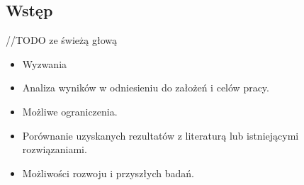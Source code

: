 \subsection{Wstęp}
//TODO ze świeżą głową
\begin{itemize}
    \item Wyzwania
    \item Analiza wyników w odniesieniu do założeń i celów pracy.
    \item Możliwe ograniczenia.
    \item Porównanie uzyskanych rezultatów z literaturą lub istniejącymi rozwiązaniami.
    \item Możliwości rozwoju i przyszłych badań.
\end{itemize}
